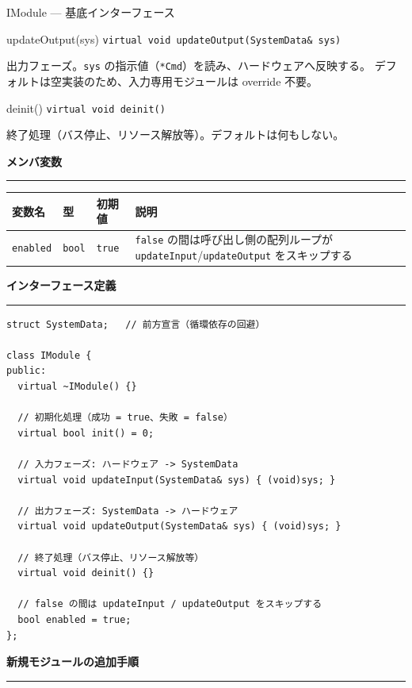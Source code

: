 \documentclass[a4paper,11pt,dvipdfmx]{jsarticle}
\makeatletter
\newcommand{\apisection}[1]{%
  \par\addvspace{4mm}%
  {\normalsize\bfseries\color{headerblue} #1}%
  \par\vspace{-1mm}%
  {\color{accentblue!40}\rule{\linewidth}{0.5pt}}%
  \par\nobreak\vspace{2mm}%
  \@afterheading
}
\makeatother
\begin{document}
\begin{apibox}{IModule --- 基底インターフェース}
\begin{funcblock}{updateOutput(sys)}
\texttt{virtual void updateOutput(SystemData\& sys)}

\vspace{1.5mm}
出力フェーズ。\texttt{sys} の指示値（\texttt{*Cmd}）を読み、ハードウェアへ反映する。
デフォルトは空実装のため、入力専用モジュールは override 不要。
\end{funcblock}

\begin{funcblock}{deinit()}
\texttt{virtual void deinit()}

\vspace{1.5mm}
終了処理（バス停止、リソース解放等）。デフォルトは何もしない。
\end{funcblock}

\apisection{メンバ変数}

\begin{tabularx}{\textwidth}{l l l X}
\toprule
\textbf{変数名} & \textbf{型} & \textbf{初期値} & \textbf{説明} \\
\midrule
\texttt{enabled} & \texttt{bool} & \texttt{true} &
  \texttt{false} の間は呼び出し側の配列ループが
  \texttt{updateInput}/\texttt{updateOutput} をスキップする \\
\bottomrule
\end{tabularx}

\apisection{インターフェース定義}

\begin{lstlisting}[caption={IModule インターフェース定義},label=lst:imodule]
struct SystemData;   // 前方宣言（循環依存の回避）

class IModule {
public:
  virtual ~IModule() {}

  // 初期化処理（成功 = true、失敗 = false）
  virtual bool init() = 0;

  // 入力フェーズ: ハードウェア -> SystemData
  virtual void updateInput(SystemData& sys) { (void)sys; }

  // 出力フェーズ: SystemData -> ハードウェア
  virtual void updateOutput(SystemData& sys) { (void)sys; }

  // 終了処理（バス停止、リソース解放等）
  virtual void deinit() {}

  // false の間は updateInput / updateOutput をスキップする
  bool enabled = true;
};
\end{lstlisting}

\apisection{新規モジュールの追加手順}


\end{apibox}
\end{document}
